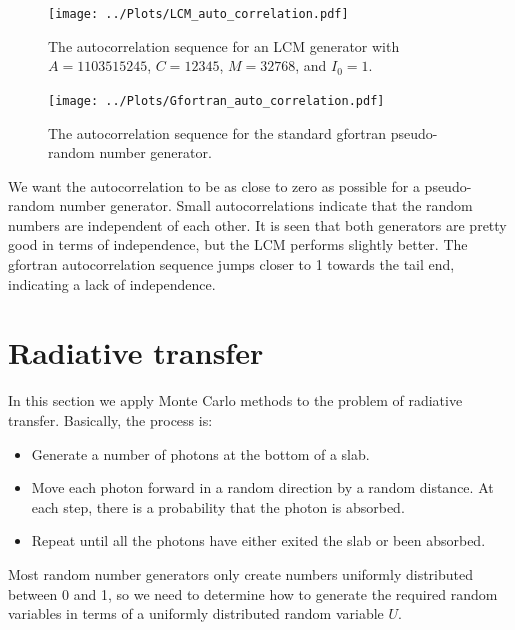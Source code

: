 \documentclass[twocolumn]{myarticle}
\begin{document}
\begin{figure}[ht!]
    \begin{center}
    \texttt{[image: ../Plots/LCM\_auto\_correlation.pdf]}
    \caption{%
        The autocorrelation sequence for an LCM generator with $ A = 1103515245 $, $ C = 12345 $, $ M = 32768 $, and $ I_0 = 1 $.
    }
    \label{fig:lcm_auto_correlation}
    \end{center}
\end{figure}

\begin{figure}[ht!]
    \begin{center}
    \texttt{[image: ../Plots/Gfortran\_auto\_correlation.pdf]}
    \caption{%
        The autocorrelation sequence for the standard gfortran pseudo-random number generator. 
    }
    \label{fig:gfortran_auto_correlation}
    \end{center}
\end{figure}

We want the autocorrelation to be as close to zero as possible for a pseudo-random number generator.
Small autocorrelations indicate that the random numbers are independent of each other.
It is seen that both generators are pretty good in terms of independence, but the LCM performs slightly better.
The gfortran autocorrelation sequence jumps closer to 1 towards the tail end, indicating a lack of independence.

\section{Radiative transfer}
\label{sec:radiative_transfer}

In this section we apply Monte Carlo methods to the problem of radiative transfer.
Basically, the process is:
\begin{itemize}
\item
    Generate a number of photons at the bottom of a slab.
\item
    Move each photon forward in a random direction by a random distance.
    At each step, there is a probability that the photon is absorbed.
\item
    Repeat until all the photons have either exited the slab or been absorbed.
\end{itemize}

Most random number generators only create numbers uniformly distributed between 0 and 1, so we need to determine how to generate the required random variables in terms of a uniformly distributed random variable $ U $.
\end{document}
